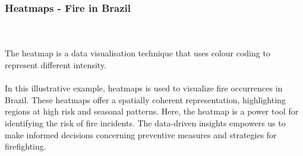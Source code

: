 \documentclass{article}\usepackage[]{graphicx}\usepackage[]{xcolor}
\begin{document}
\subsubsection{Heatmaps - Fire in Brazil}
\\  
\\The heatmap is a data visualisation technique that uses colour coding to represent different intensity.
\\  
\\In this illustrative example, heatmaps is used to visualize fire occurrences in Brazil. These heatmaps offer a spatially coherent representation, highlighting regions at high risk and seasonal patterns. Here, the heatmap is a power tool for identifying the risk of fire incidents. The data-driven insights empowers us to make informed decisions concerning preventive measures and strategies for firefighting.
\end{document}

